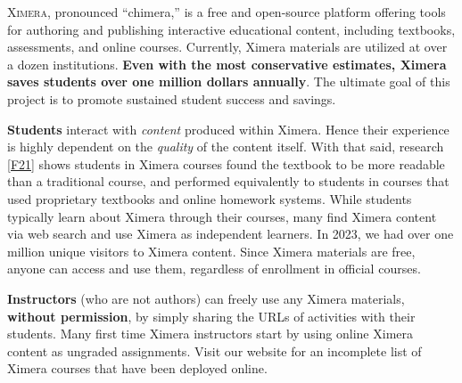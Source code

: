 \documentclass[twocolumn]{article}
\begin{document}
\pagestyle{main}
\thispagestyle{title}
\noindent
\lettrine[lines=2]{X}{imera}, pronounced ``chimera,'' is a free and
open-source platform offering tools for authoring and publishing
interactive educational content, including textbooks, assessments, and
online
courses. Currently, Ximera materials are utilized at over a dozen
institutions. \textbf{Even with the most conservative estimates, Ximera saves
    students
    over one million dollars annually}. The ultimate goal of this project is to
promote sustained student success and savings.

\begin{xframe}
    {\sffamily\bfseries Students} interact with \textit{content} produced
    within
    Ximera. Hence their experience is highly dependent on the
    \textit{quality} of
    the content itself. With that said, research \ref{F21} shows students in
    Ximera courses found the textbook to be more readable than a traditional
    course, and performed equivalently to students in courses that used
    proprietary textbooks and online homework systems.
    While students typically learn about Ximera through their courses, many
    find Ximera content via web search and  use Ximera as independent learners.
    In 2023, we had over one million unique visitors to Ximera content. Since
    Ximera materials are free,
    anyone can access and use them, regardless of enrollment in official
    courses.
\end{xframe}

\begin{xframe}
    {\sffamily\bfseries Instructors} (who are not authors) can freely use
    any Ximera materials,
    \textbf{without permission}, by simply sharing the URLs of activities
    with their students. Many first time Ximera instructors start  by
    using online Ximera content as
    ungraded assignments. Visit our website for an incomplete list of
    Ximera courses that have been deployed online.
\end{xframe}
\end{document}
